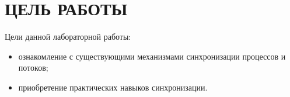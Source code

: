 \section{ЦЕЛЬ РАБОТЫ}

Цели данной лабораторной работы:

\begin{itemize}
\item ознакомление с существующими механизмами 
  синхронизации процессов и потоков;
\item приобретение практических навыков синхронизации.
\end{itemize}

\newpage